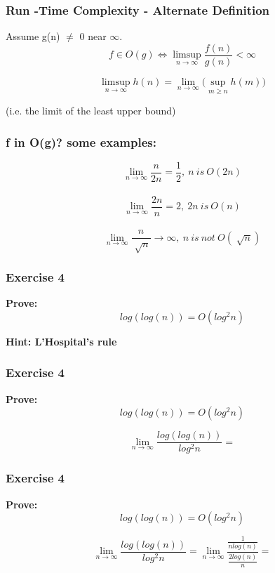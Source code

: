 \documentclass{beamer}
\begin{document}
\begin{frame}
\frametitle{Run -Time Complexity - Alternate Definition}
 

Assume g(n) $\ne $ 0 near $\infty$. \\

$$f \in O(g) \iff   \limsup\limits_{n\rightarrow \infty} \frac{f(n)}{g(n)} < \infty  $$ 

$$\limsup\limits_{n\rightarrow \infty} h(n) = \lim\limits_{n\to \infty} \Big (\sup_{m\geq n} h(m) \Big)$$ 

  (i.e. the limit of the least upper bound) 
 
\end{frame}
 
 


\begin{frame}
\frametitle{f in O(g)? some examples:}
 $$\lim_{n \to \infty} \frac{n}{2n}  = \frac{1}{2}, \ n \
 is \ O(2n)$$\\
 
  $$\lim_{n \to \infty} \frac{2n}{n}  = 2, \ 2n \ is \ O(n)$$ \\
  
  $$\lim_{n \to \infty}  \frac{ n}{\sqrt[]{n} } \to \infty, \ n \ is \ not \ O(\sqrt[]{n} )$$  
  

  \end{frame}

\begin{frame}
\frametitle{Exercise 4}
\textbf{Prove:} $$log(log(n))=O(log^{2}n)$$
 



{\color{blue}\textbf{Hint: L'Hospital's rule} }
\vspace{2cm}
  
\end{frame}

\begin{frame}[noframenumbering]
\frametitle{Exercise 4}
\textbf{Prove:} $$log(log(n))=O(log^{2}n)$$

 
  $$\lim_{n \to \infty} \frac{log(log(n))}{log^{2}n}= $$
 
\end{frame}

\begin{frame}[noframenumbering]
\frametitle{Exercise 4}
\textbf{Prove:} $$log(log(n))=O(log^{2}n)$$

 
  $$\lim_{n \to \infty} \frac{log(log(n))}{log^{2}n}=\lim_{n \to \infty} \frac{\frac{1}{nlog(n)}}{\frac{2log(n)}{n}}=  $$

\end{frame}
\end{document}
